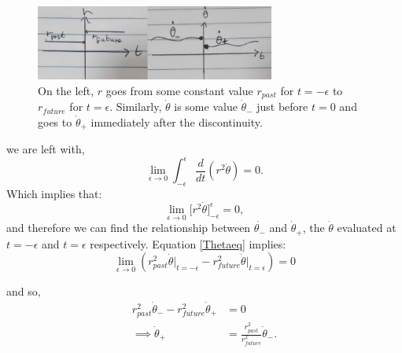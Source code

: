 \documentclass[12pt]{article}
\begin{document}
\begin{figure}[H]
    \centering
    \includegraphics[width=0.7\textwidth]{Figures/Jumpdiscont.jpg}
    \caption{On the left, $r$ goes from some constant value $r_{past}$  for $t = -\epsilon$ to $r_{future}$ for $t=\epsilon$. Similarly, $\dot{\theta}$ is some value $\dot{\theta}_-$ just before $t=0$ and goes to $\dot{\theta}_+$ immediately after the discontinuity. \label{Figrjump}}
    \label{fig1}
\end{figure}
we are left with,
$$\lim_{\epsilon \to 0} \int_{-\epsilon} ^ \epsilon \frac{d}{dt}(r^2 \dot{\theta}) = 0.$$
Which implies that:
\begin{equation}
\lim_{\epsilon \to 0}\big[r^2 \dot{\theta}\big]^\epsilon_{-\epsilon} = 0,\label{Thetaeq}
\end{equation}
and therefore we can find the relationship between $\dot{\theta_-}$ and $\dot{\theta}_+$, the $\dot{\theta}$ evaluated at $t=-\epsilon$ and $t = \epsilon$ respectively. Equation \ref{Thetaeq} implies:
$$\lim_{\epsilon \to 0}(r^2_{past} \dot{\theta} \big|_{t= -\epsilon} - r^2_{future} \dot{\theta} \big|_{t=\epsilon}) = 0$$

and so,
\begin{align}
    r^2_{past} \dot{\theta}_- - r^2_{future} \dot{\theta}_+ &= 0 \\
    \implies \dot{\theta}_+ &= \frac{r^2_{past}}{r^2_{future}}\dot{\theta}_-. \label{eq: ratio of past and present velocity}
\end{align}


\end{document}
